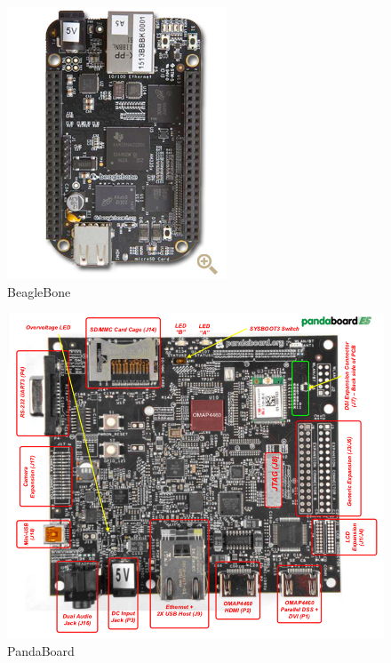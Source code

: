   \begin{figure}[htbp]
   \centering
   \includegraphics[scale=0.7,keepaspectratio=true]{./imagenes/beaglebone.jpg}
   \caption{BeagleBone}
   \label{figura:BeagleBone}
  \end{figure}

  \begin{figure}[htbp]
   \centering
   \includegraphics[scale=0.4,keepaspectratio=true]{./imagenes/pandaboard.png}
   \caption{PandaBoard}
   \label{figura:PandaBoard}
  \end{figure}

